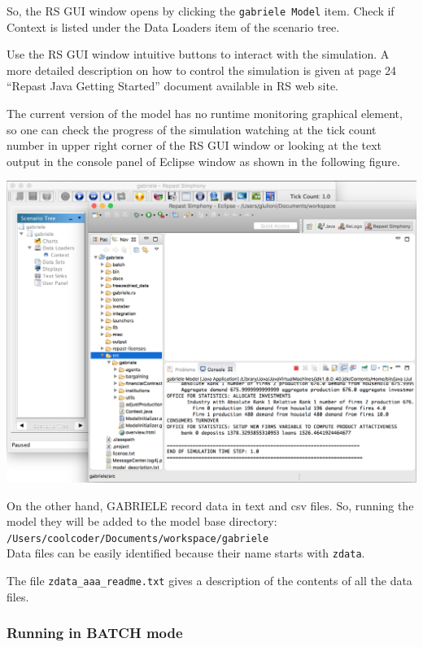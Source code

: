\documentclass{book}
\begin{document}
So, the RS GUI window opens by clicking the \verb+gabriele Model+ item. Check if Context is listed under the Data Loaders item of the scenario tree.

Use the RS GUI window intuitive buttons to interact with the simulation. A more detailed description on how to control the simulation is given at page 24 ``Repast Java Getting Started'' document available in RS web site.

The current version of the model has no runtime monitoring graphical element, so one can check the progress of the simulation watching at the tick count number in upper right corner of the RS GUI window or looking at the text output in the console panel of Eclipse window as shown in the following figure. 

\vskip2mm
\noindent
\includegraphics[scale=0.35]{fig_gabriele_rs_gui7}

\vskip2mm
On the other hand, GABRIELE record data in text and csv files. So, running the model they will be added to the model base directory:\\
\verb+/Users/coolcoder/Documents/workspace/gabriele+\\
Data files can be easily identified because their name starts with \verb+zdata+.

The file \verb+zdata_aaa_readme.txt+ gives a description of the contents of all the data files.

\subsubsection{Running in BATCH mode}
\end{document}
